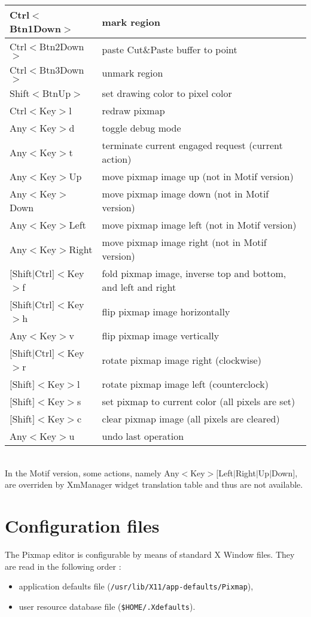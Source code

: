 \begin{tabular}{|p{4cm}|p{10cm}|}
Ctrl$<$Btn1Down$>$	& mark region\\\hline
Ctrl$<$Btn2Down$>$	& paste Cut\&Paste buffer to point\\\hline
Ctrl$<$Btn3Down$>$	& unmark region\\\hline
Shift$<$BtnUp$>$	& set drawing color to pixel color\\\hline
Ctrl$<$Key$>$l		& redraw pixmap\\\hline
Any$<$Key$>$d		& toggle debug mode\\\hline
Any$<$Key$>$t		& terminate current engaged request (current action)\\\hline
Any$<$Key$>$Up		& move pixmap image up (not in Motif version)\\\hline
Any$<$Key$>$Down	& move pixmap image down (not in Motif version)\\\hline
Any$<$Key$>$Left	& move pixmap image left (not in Motif version)\\\hline
Any$<$Key$>$Right	& move pixmap image right (not in Motif version)\\\hline
$[$Shift$|$Ctrl$]<$Key$>$f& fold pixmap image, inverse top and bottom, and left
and right\\\hline
$[$Shift$|$Ctrl$]<$Key$>$h	& flip pixmap image horizontally\\\hline
Any$<$Key$>$v		& flip pixmap image vertically\\\hline
$[$Shift$|$Ctrl$]<$Key$>$r& rotate pixmap image right (clockwise)\\\hline
$[$Shift$]<$Key$>$l	& rotate pixmap image left (counterclock)\\\hline
$[$Shift$]<$Key$>$s	& set pixmap to current color (all pixels are set)\\\hline
$[$Shift$]<$Key$>$c	& clear pixmap image (all pixels are cleared)\\\hline
Any$<$Key$>$u		& undo last operation\\\hline
\end{tabular}\\

In the Motif version, some actions, namely
Any$<$Key$>[$Left$|$Right$|$Up$|$Down$]$, are overriden by XmManager
widget translation table and thus are not available.\\

\section{Configuration files}

The Pixmap editor is configurable by means of standard X Window files.
They are read in the following order : 
\begin{itemize} 
\item application defaults file ({\tt /usr/lib/X11/app-defaults/Pixmap}), 
\item user resource database file ({\tt \$HOME/.Xdefaults}).
\end{itemize} 

